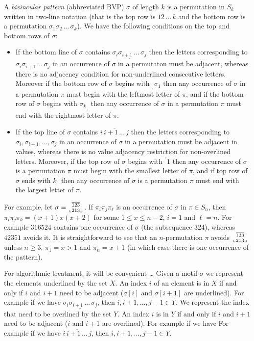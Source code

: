 \documentclass[a4paper]{llncs}
\newcommand{\pmotif}{\sigma}
\newcommand\BV[2]{\genfrac{}{}{0pt}{}{#1}{#2}}
\newcommand{\x}{X}
\newcommand{\y}{Y}
\begin{document}
A \emph{bivincular pattern} (abbreviated BVP) $\sigma$
of length $k$ is a permutation in $S_k$ written in
two-line notation
(that is the top row is $12\,\ldots\,k$ and the bottom row
is a permutation $\sigma_1\sigma_2\,\ldots\,\sigma_k$).
We have the following conditions on the top and bottom rows
of $\sigma$:
\begin{itemize}
	\item
	If the bottom line of $\sigma$ contains
	$\underline{\sigma_i\sigma_{i+1}\,\ldots\,\sigma_j}$
	then the letters corresponding to
	$\sigma_i\sigma_{i+1}\,\ldots\,\sigma_j$ in an occurrence of
	$\sigma$ in a permutaton must be adjacent, whereas there is
	no adjacency condition for
	non-underlined consecutive letters.
	Moreover if the bottom row of $\sigma$ begins with
	$_\llcorner{\sigma_1}$ then any occurrence of $\sigma$
	in a permutation $\pi$ must begin with the leftmost
	letter of $\pi$,
	and
	if the bottom row of $\sigma$ begins with
	${\sigma_k}_\lrcorner$ then any occurrence of $\sigma$
	in a permutation $\pi$ must end with the rightmost
	letter of $\pi$.
	\item
	If the top line of $\sigma$ contains
	$\overline{i\,i+1\,\ldots\,j}$ then the letters corresponding to
	$\sigma_i, \sigma_{i+1}, \ldots, \sigma_j$ in an
	occurrence of $\sigma$ in a permutation must be adjacent in values,
	whereas there is no value adjacency restriction for non-overlined
	letters.
	Moreover, if the top row of $\sigma$ begins with
	$^\ulcorner{1}$ then
	any occurrence of $\sigma$ is a permutation $\pi$ must begin with
	the smallest letter of $\pi$, and
	if top row of $\sigma$ ends with $k^\urcorner$ then
	any occurrence of $\sigma$ is a permutation $\pi$ must end with
	the largest letter of $\pi$.
\end{itemize}
For example,
let
$\sigma = \BV{\overline{123}}{\llcorner 213 \lrcorner}$.
If $\pi_i\pi_j\pi_\ell$ is an occurrence of $\sigma$ in $\pi \in S_n$,
then $\pi_i\pi_j\pi_k = (x+1)x(x+2)$ for some $1 \leq x \leq n-2$,
$i=1$ and $\ell = n$.
For example $316524$ contains one occurrence of $\sigma$ (the subsequence $324$),
whereas $42351$ avoids it.
It is straightforward to see that an $n$-permutation
$\pi$ avoids $\BV{\overline{123}}{\llcorner 213 \lrcorner}$ unless
$n \geq 3$,
$\pi_1 = x > 1$
and $\pi_n = x+1$
(in which case there is one occurrence of the pattern).

For algorithmic treatment, it will be convenient \ldots
Given a motif $\pmotif$ we represent the elements underlined by the set $\x$. An index $i$ of an element is in $\x$ if and only if $i$ and $i+1$ need to be adjacent ($\pmotif[i]$ and $\pmotif[i+1]$ are underlined).
For example if we have $\underline{\sigma_i\sigma_{i+1}\,\ldots\,\sigma_j}$, then ${i,i+1,\ldots,j-1} \in \y$.
We represent the index that need to be overlined by the set $\y$. An index $i$ is in $\y$ if and only if $i$ and $i+1$ need to be adjacent ($i$ and $i+1$ are overlined).
For example if we have
For example if we have $\overline{i\,i+1\,\ldots\,j}$, then ${i,i+1,\ldots,j-1} \in \y$.
\end{document}
